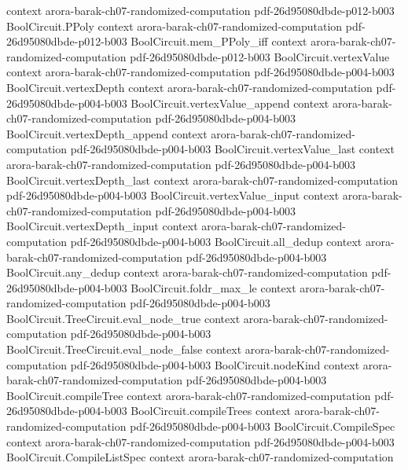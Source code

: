 \begin{theorem}
  {context}
  {arora-barak-ch07-randomized-computation}
  {pdf-26d95080dbde-p012-b003}
\proofstep
  {BoolCircuit.PPoly}
  {context}
  {arora-barak-ch07-randomized-computation}
  {pdf-26d95080dbde-p012-b003}
\proofstep
  {BoolCircuit.mem_PPoly_iff}
  {context}
  {arora-barak-ch07-randomized-computation}
  {pdf-26d95080dbde-p012-b003}
\proofstep
  {BoolCircuit.vertexValue}
  {context}
  {arora-barak-ch07-randomized-computation}
  {pdf-26d95080dbde-p004-b003}
\proofstep
  {BoolCircuit.vertexDepth}
  {context}
  {arora-barak-ch07-randomized-computation}
  {pdf-26d95080dbde-p004-b003}
\proofstep
  {BoolCircuit.vertexValue_append}
  {context}
  {arora-barak-ch07-randomized-computation}
  {pdf-26d95080dbde-p004-b003}
\proofstep
  {BoolCircuit.vertexDepth_append}
  {context}
  {arora-barak-ch07-randomized-computation}
  {pdf-26d95080dbde-p004-b003}
\proofstep
  {BoolCircuit.vertexValue_last}
  {context}
  {arora-barak-ch07-randomized-computation}
  {pdf-26d95080dbde-p004-b003}
\proofstep
  {BoolCircuit.vertexDepth_last}
  {context}
  {arora-barak-ch07-randomized-computation}
  {pdf-26d95080dbde-p004-b003}
\proofstep
  {BoolCircuit.vertexValue_input}
  {context}
  {arora-barak-ch07-randomized-computation}
  {pdf-26d95080dbde-p004-b003}
\proofstep
  {BoolCircuit.vertexDepth_input}
  {context}
  {arora-barak-ch07-randomized-computation}
  {pdf-26d95080dbde-p004-b003}
\proofstep
  {BoolCircuit.all_dedup}
  {context}
  {arora-barak-ch07-randomized-computation}
  {pdf-26d95080dbde-p004-b003}
\proofstep
  {BoolCircuit.any_dedup}
  {context}
  {arora-barak-ch07-randomized-computation}
  {pdf-26d95080dbde-p004-b003}
\proofstep
  {BoolCircuit.foldr_max_le}
  {context}
  {arora-barak-ch07-randomized-computation}
  {pdf-26d95080dbde-p004-b003}
\proofstep
  {BoolCircuit.TreeCircuit.eval_node_true}
  {context}
  {arora-barak-ch07-randomized-computation}
  {pdf-26d95080dbde-p004-b003}
\proofstep
  {BoolCircuit.TreeCircuit.eval_node_false}
  {context}
  {arora-barak-ch07-randomized-computation}
  {pdf-26d95080dbde-p004-b003}
\proofstep
  {BoolCircuit.nodeKind}
  {context}
  {arora-barak-ch07-randomized-computation}
  {pdf-26d95080dbde-p004-b003}
\proofstep
  {BoolCircuit.compileTree}
  {context}
  {arora-barak-ch07-randomized-computation}
  {pdf-26d95080dbde-p004-b003}
\proofstep
  {BoolCircuit.compileTrees}
  {context}
  {arora-barak-ch07-randomized-computation}
  {pdf-26d95080dbde-p004-b003}
\proofstep
  {BoolCircuit.CompileSpec}
  {context}
  {arora-barak-ch07-randomized-computation}
  {pdf-26d95080dbde-p004-b003}
\proofstep
  {BoolCircuit.CompileListSpec}
  {context}
  {arora-barak-ch07-randomized-computation}

\end{theorem}
